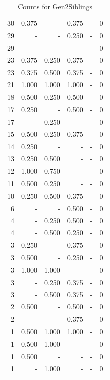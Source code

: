 \documentclass[a4paper]{article}\usepackage[]{graphicx}\usepackage[]{color}
\begin{document}
\begin{table}[ht]
\begin{tabular}{rrrrrr}
   \rowcolor{sosoColor} 30 & 0.375 & - & 0.375 & - & 0 \\ 
   \rowcolor{sosoColor} 29 & - & - & 0.250 & - & 0 \\ 
   \rowcolor{nullColor} 29 & - & - & - & - & 0 \\ 
  23 & 0.375 & 0.250 & 0.375 & - & 0 \\ 
  23 & 0.375 & 0.500 & 0.375 & - & 0 \\ 
   \rowcolor{goodColor} 21 & 1.000 & 1.000 & 1.000 & - & 0 \\ 
   \rowcolor{badColor} 18 & 0.500 & 0.250 & 0.500 & - & 0 \\ 
   \rowcolor{sosoColor} 17 & 0.250 & - & 0.500 & - & 0 \\ 
  17 & - & 0.250 & - & - & 0 \\ 
  15 & 0.500 & 0.250 & 0.375 & - & 0 \\ 
   \rowcolor{nullColor} 14 & 0.250 & - & - & - & 0 \\ 
  13 & 0.250 & 0.500 & - & - & 0 \\ 
  12 & 1.000 & 0.750 & - & - & 0 \\ 
  11 & 0.500 & 0.250 & - & - & 0 \\ 
  10 & 0.250 & 0.500 & 0.375 & - & 0 \\ 
   \rowcolor{sosoColor} 6 & - & - & 0.500 & - & 0 \\ 
   \rowcolor{badColor} 4 & - & 0.250 & 0.500 & - & 0 \\ 
   \rowcolor{badColor} 4 & - & 0.500 & 0.250 & - & 0 \\ 
   \rowcolor{sosoColor} 3 & 0.250 & - & 0.375 & - & 0 \\ 
   \rowcolor{sosoColor} 3 & 0.500 & - & 0.250 & - & 0 \\ 
  3 & 1.000 & 1.000 & - & - & 0 \\ 
  3 & - & 0.250 & 0.375 & - & 0 \\ 
  3 & - & 0.500 & 0.375 & - & 0 \\ 
   \rowcolor{sosoColor} 2 & 0.500 & - & 0.500 & - & 0 \\ 
   \rowcolor{sosoColor} 2 & - & - & 0.375 & - & 0 \\ 
   \rowcolor{goodColor} 1 & 0.500 & 1.000 & 1.000 & - & 0 \\ 
  1 & 0.500 & 1.000 & - & - & 0 \\ 
   \rowcolor{nullColor} 1 & 0.500 & - & - & - & 0 \\ 
  1 & - & 1.000 & - & - & 0 \\ 
   \hline
\end{tabular}
\caption{Counts for Gen2Siblings} 
\end{table}
\end{document}
